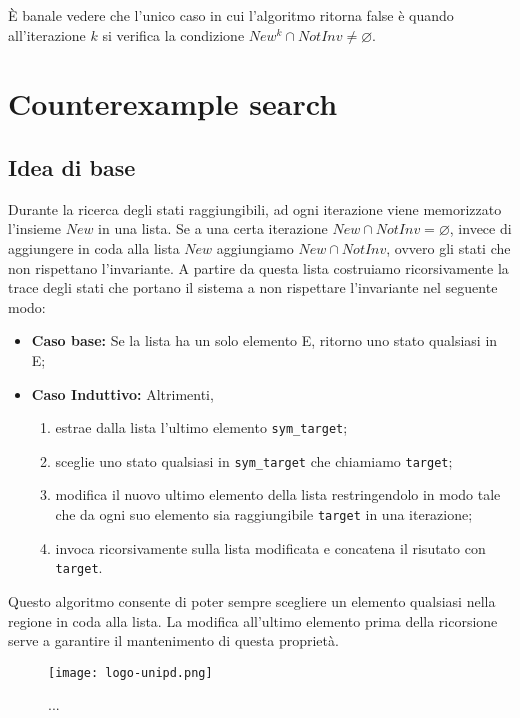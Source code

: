 \documentclass[12pt]{article}
\begin{document}
    È banale vedere che l'unico caso in cui l'algoritmo ritorna false è quando all'iterazione $k$ si verifica la condizione $New^k \cap NotInv \neq \varnothing$.
    
    \section{Counterexample search}
    \subsection{Idea di base}
    Durante la ricerca degli stati raggiungibili, ad ogni iterazione viene memorizzato l'insieme $New$ in una lista.
    Se a una certa iterazione $New \cap NotInv = \varnothing$, invece di aggiungere in coda alla lista $New$ aggiungiamo $New \cap NotInv$, ovvero gli stati che non rispettano l'invariante.
    A partire da questa lista costruiamo ricorsivamente la trace degli stati che portano il sistema a non rispettare l'invariante nel seguente modo:
    \begin{itemize}
        \item \textbf{Caso base:} Se la lista ha un solo elemento E, ritorno uno stato qualsiasi in E;
        \item \textbf{Caso Induttivo:} Altrimenti, 
        \begin{enumerate}
            \item estrae dalla lista l'ultimo elemento \texttt{sym\_target};
            \item sceglie uno stato qualsiasi in \texttt{sym\_target} che chiamiamo \texttt{target};
            \item modifica il nuovo ultimo elemento della lista restringendolo in modo tale che da ogni suo elemento sia raggiungibile \texttt{target} in una iterazione;
            \item invoca ricorsivamente sulla lista modificata e concatena il risutato con \texttt{target}.
        \end{enumerate}
    \end{itemize}

    Questo algoritmo consente di poter sempre scegliere un elemento qualsiasi nella regione in coda alla lista.
    La modifica all'ultimo elemento prima della ricorsione serve a garantire il mantenimento di questa proprietà.

    \begin{figure}[H] 
        \centering
        \texttt{[image: logo-unipd.png]}
        \caption{...}
    \end{figure}
\end{document}
